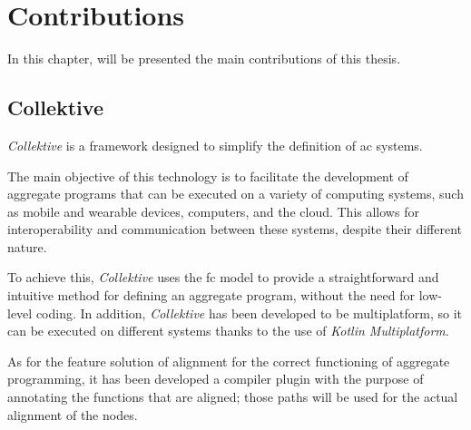 
\chapter{Contributions}
\label{ch:contributions}
In this chapter, will be presented the main contributions of this thesis.

\section{Collektive}
\label{sec:collektive}
\emph{Collektive} is a framework designed to simplify the definition of \ac{ac} systems.

The main objective of this technology is to facilitate the development of aggregate programs that can be executed on a
variety of computing systems, such as mobile and wearable devices, computers, and the cloud.
This allows for interoperability and communication between these systems, despite their different nature.

To achieve this, \emph{Collektive} uses the \ac{fc} model to provide a straightforward and intuitive method for defining
an aggregate program, without the need for low-level coding.
In addition, \emph{Collektive} has been developed to be multiplatform, so it can be executed on different systems thanks
to the use of \emph{Kotlin Multiplatform}.

As for the feature solution of alignment for the correct functioning of aggregate programming,
it has been developed a compiler plugin with the purpose of annotating the functions that are aligned;
those paths will be used for the actual alignment of the nodes.

